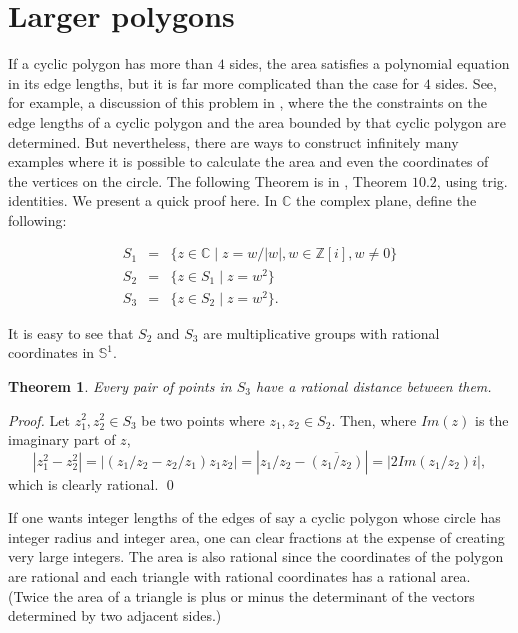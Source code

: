 \documentclass[11pt]{article}
\newtheorem{theorem}{Theorem}[section]
\numberwithin{equation}{section}
\numberwithin{figure}{section}
\newcommand{\Z}{\mathbb Z}
\newcommand{\C}{\mathbb C}
\newcommand{\SSS}{\mathbb S}
\begin{document}
    \section{Larger polygons} \label{section:Ulam}
 
 If a cyclic polygon has more than $4$ sides, the area satisfies a polynomial equation in its edge lengths, but it is far more complicated than the case for $4$ sides. See, for example, a discussion of this problem in \cite{Num-theory, Robbins-Monthly, Robbins-DCG}, where the the constraints on the edge lengths of a cyclic polygon and the area bounded by that cyclic polygon are determined. But nevertheless, there are ways to construct infinitely many examples where it is possible to calculate the area and even the coordinates of the vertices on the circle.  The following Theorem is in \cite{Klee-book}, Theorem $10.2$, using trig. identities.  We present a quick proof here.  %
 In $\C$ the complex plane, define the following:
 
 \begin{eqnarray*}
S_1 &=& \{ z \in \C\mid z=w/|w|, w \in \Z[i],w\ne 0\}\\
 S_2 &=& \{ z \in S_1\mid z=w^2  \}\\
S_3 &=& \{ z \in S_2\mid z=w^2\}.
\end{eqnarray*}

It is easy to see that $S_2$ and $S_3$ are multiplicative groups with rational coordinates in $\SSS^1$.

\begin{theorem} Every pair of points in $S_3$ have a rational distance between them.
\end{theorem}

\begin{proof}Let $z_1^2, z_2^2 \in S_3$ be two points where $z_1,z_2 \in S_2$.  Then, where $Im(z)$ is the imaginary part of $z$,
\[|z_1^2- z_2^2|=|(z_1/z_2 - z_2/z_1)z_1z_2|=|z_1/z_2-\overline{(z_1/z_2)}|=|2 Im(z_1/z_2)i|,
\]
which is clearly rational. \qed  
\end{proof}

If one wants integer lengths of the edges of say a cyclic polygon whose circle has integer radius and integer area, one can clear fractions at the expense of creating very large integers.  The area is also rational since the coordinates of the polygon are rational and each triangle with rational coordinates has a rational area.  (Twice the area of a triangle is plus or minus the determinant of the vectors determined by two adjacent sides.)
\end{document}
